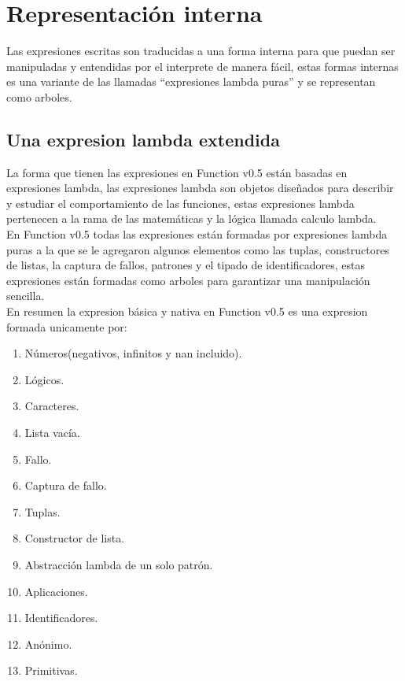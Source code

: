 
\titlespacing{\subsection}{0pt}{10pt}{0pt}

\chapter{Representación interna}
   Las expresiones escritas son traducidas a una forma interna para que puedan ser manipuladas y entendidas por el interprete de manera fácil, estas formas internas es una variante de las llamadas ``expresiones lambda puras'' y se representan como arboles.
   
   \section{Una expresion lambda extendida}
      La forma que tienen las expresiones en Function v0.5 están basadas en expresiones lambda, las expresiones lambda son objetos diseñados para describir y estudiar el comportamiento de las funciones, estas expresiones lambda pertenecen a la rama de las matemáticas y la lógica llamada calculo lambda.
      \\
      
      En Function v0.5 todas las expresiones están formadas por expresiones lambda puras a la que se le agregaron algunos elementos como las tuplas, constructores de listas, la captura de fallos, patrones y el tipado de identificadores, estas expresiones están formadas como arboles para garantizar una manipulación sencilla.
      \\
      
      En resumen la expresion básica y nativa en Function v0.5 es una expresion formada unicamente por:
      
      \begin{enumerate}
         \item Números(negativos, infinitos y nan incluido).
         \item Lógicos.
         \item Caracteres.
         \item Lista vacía.
         \item Fallo.
         \item Captura de fallo.
         \item Tuplas.
         \item Constructor de lista.
         \item Abstracción lambda de un solo patrón.
         \item Aplicaciones.
         \item Identificadores.
         \item Anónimo.
         \item Primitivas.
      \end{enumerate}
      
